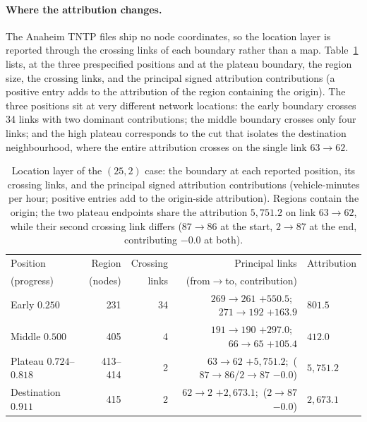 \paragraph{Where the attribution changes.}
The Anaheim TNTP files ship no node coordinates, so the location layer
is reported through the crossing links of each boundary rather than a
map. Table~\ref{tab:anaheimcrossing} lists, at the three prespecified
positions and at the plateau boundary, the region size, the crossing
links, and the principal signed attribution contributions (a positive
entry adds to the attribution of the region containing the origin). The
three positions sit at very different network locations: the early
boundary crosses 34 links with two dominant contributions; the middle
boundary crosses only four links; and the high plateau corresponds to
the cut that isolates the destination neighbourhood, where the entire
attribution crosses on the single link $63\!\to\!62$.
\begin{table}[t]\centering\footnotesize
\caption{Location layer of the $(25,2)$ case: the boundary at each
reported position, its crossing links, and the principal signed
attribution contributions (vehicle-minutes per hour; positive entries
add to the origin-side attribution). Regions contain the origin; the two
plateau endpoints share the attribution $5{,}751.2$ on link
$63\!\to\!62$, while their second crossing link differs ($87\!\to\!86$
at the start, $2\!\to\!87$ at the end, contributing $-0.0$ at
both).}\label{tab:anaheimcrossing}
\setlength{\tabcolsep}{4pt}
\begin{tabular*}{\tblwidth}{@{\extracolsep{\fill}}lrrrl}
\toprule
Position & Region & Crossing & Principal links & Attribution\\
(progress) & (nodes) & links & (from$\to$to, contribution) &\\
\midrule
Early $0.250$ & 231 & 34 & $269\!\to\!261$ $+550.5$;\ $271\!\to\!192$ $+163.9$ & $801.5$\\
Middle $0.500$ & 405 & 4 & $191\!\to\!190$ $+297.0$;\ $66\!\to\!65$ $+105.4$ & $412.0$\\
Plateau $0.724$--$0.818$ & 413--414 & 2 & $63\!\to\!62$ $+5{,}751.2$;\ ($87\!\to\!86$/$2\!\to\!87$ $-0.0$) & $5{,}751.2$\\
Destination $0.911$ & 415 & 2 & $62\!\to\!2$ $+2{,}673.1$;\ ($2\!\to\!87$ $-0.0$) & $2{,}673.1$\\
\bottomrule\end{tabular*}\end{table}

